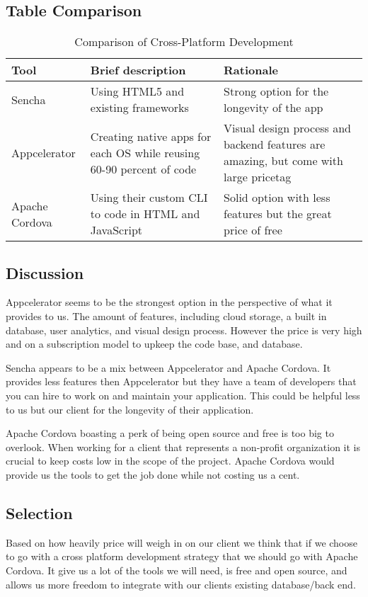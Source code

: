 \documentclass[letterpaper,10pt,draftclsnofoot,onecolumn,titlepage]{IEEEtran}
\begin{document}
	\subsection{Table Comparison}
	\begin{table}[ht]
	\caption{Comparison of Cross-Platform Development}
	\begin{center}
	\begin{tabular} { | m{3cm} | m{5cm} | m{5cm} | }
	\hline\hline
	Tool & Brief description & Rationale \\ [0.5ex]
	\hline
	Sencha & Using HTML5 and existing frameworks & Strong option for the longevity of the app\\
	\hline
	Appcelerator & Creating native apps for each OS while reusing 60-90 percent of code & Visual design process and backend features are amazing, but come with large pricetag\\
	\hline
	Apache Cordova & Using their custom CLI to code in HTML and JavaScript & Solid option with less features but the great price of free\\
	\hline

	\end{tabular}
	\end{center}
	\end{table}
	\subsection{Discussion}
	Appcelerator seems to be the strongest option in the perspective of what it provides to us. The amount of features, including cloud storage, a built in database, user analytics, and visual design process. However the price is very high and on a subscription model to upkeep the code base, and database.
	
	Sencha appears to be a mix between Appcelerator and Apache Cordova. It provides less features then Appcelerator but they have a team of developers that you can hire to work on and maintain your application. This could be helpful less to us but our client for the longevity of their application.
	
	Apache Cordova boasting a perk of being open source and free is too big to overlook. When working for a client that represents a non-profit organization it is crucial to keep costs low in the scope of the project. Apache Cordova would provide us the tools to get the job done while not costing us a cent.

	\subsection{Selection}
	Based on how heavily price will weigh in on our client we think that if we choose to go with a cross platform development strategy that we should go with Apache Cordova. It give us a lot of the tools we will need, is free and open source, and allows us more freedom to integrate with our clients existing database/back end. 
\end{document}
